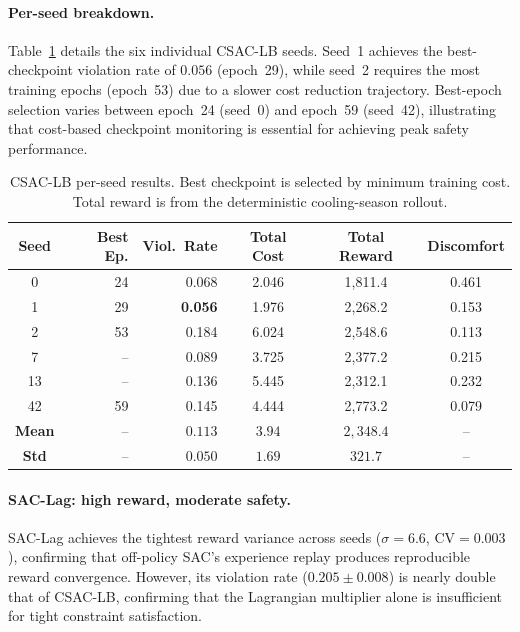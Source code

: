 \paragraph{Per-seed breakdown.}
Table~\ref{tab:csaclb-perseed} details the six individual CSAC-LB seeds.
Seed~1 achieves the best-checkpoint violation rate of $0.056$ (epoch~29),
while seed~2 requires the most training epochs (epoch~53) due to a slower
cost reduction trajectory.  Best-epoch selection varies between epoch~24
(seed~0) and epoch~59 (seed~42), illustrating that cost-based checkpoint
monitoring is essential for achieving peak safety performance.

\begin{table}[htbp]
\centering
\caption{CSAC-LB per-seed results.  Best checkpoint is selected by minimum
  training cost.  Total reward is from the deterministic cooling-season rollout.}
\label{tab:csaclb-perseed}
\begin{tabular}{crrccc}
\toprule
\textbf{Seed} &
  \textbf{Best Ep.} &
  \textbf{Viol.\ Rate} &
  \textbf{Total Cost} &
  \textbf{Total Reward} &
  \textbf{Discomfort} \\
\midrule
0  & 24 & 0.068 & 2.046 & 1{,}811.4 & 0.461 \\
1  & 29 & \textbf{0.056} & 1.976 & 2{,}268.2 & 0.153 \\
2  & 53 & 0.184 & 6.024 & 2{,}548.6 & 0.113 \\
7  & -- & 0.089 & 3.725 & 2{,}377.2 & 0.215 \\
13 & -- & 0.136 & 5.445 & 2{,}312.1 & 0.232 \\
42 & 59 & 0.145 & 4.444 & 2{,}773.2 & 0.079 \\
\midrule
\textbf{Mean} & -- & $0.113$ & $3.94$ & $2{,}348.4$ & -- \\
\textbf{Std} & -- & $0.050$ & $1.69$ & $321.7$ & -- \\
\bottomrule
\end{tabular}
\end{table}

\paragraph{SAC-Lag: high reward, moderate safety.}
SAC-Lag achieves the tightest reward variance across seeds ($\sigma = 6.6$,
$\text{CV} = 0.003$), confirming that off-policy SAC's experience replay
produces reproducible reward convergence.  However, its violation rate
($0.205 \pm 0.008$) is nearly double that of CSAC-LB, confirming that the
Lagrangian multiplier alone is insufficient for tight constraint satisfaction.

